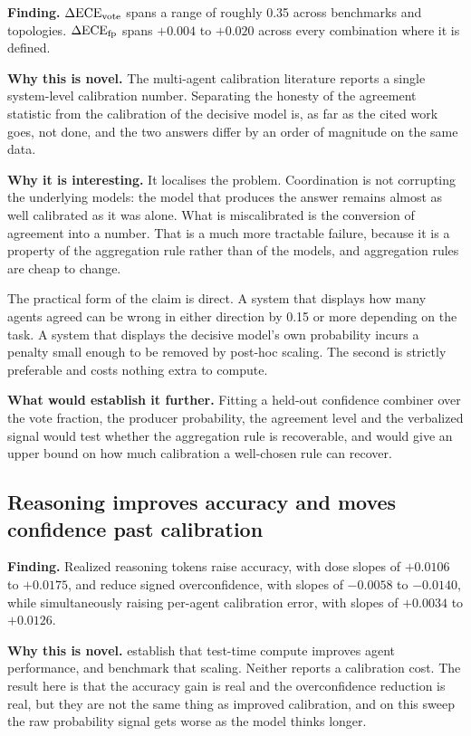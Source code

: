 \textbf{Finding.} $\Delta\mathrm{ECE}_{\mathrm{vote}}$ spans a range of roughly 0.35 across benchmarks and topologies.
$\Delta\mathrm{ECE}_{\mathrm{fp}}$ spans $+0.004$ to $+0.020$ across every combination where it is defined.

\textbf{Why this is novel.} The multi-agent calibration literature reports a single
system-level calibration number. Separating the honesty of the agreement statistic from the
calibration of the decisive model is, as far as the cited work goes, not done, and the
two answers differ by an order of magnitude on the same data.

\textbf{Why it is interesting.} It localises the problem. Coordination is not corrupting the
underlying models: the model that produces the answer remains almost as well calibrated as
it was alone. What is miscalibrated is the conversion of agreement into a number. That is a
much more tractable failure, because it is a property of the aggregation rule rather than of
the models, and aggregation rules are cheap to change.

The practical form of the claim is direct. A system that displays how many agents agreed
can be wrong in either direction by 0.15 or more depending on the task. A system that
displays the decisive model's own probability incurs a penalty small enough to be removed by
post-hoc scaling. The second is strictly preferable and costs nothing extra to compute.

\textbf{What would establish it further.} Fitting a held-out confidence combiner over the
vote fraction, the producer probability, the agreement level and the verbalized signal would
test whether the aggregation rule is recoverable, and would give an upper bound on how much
calibration a well-chosen rule can recover.

\subsection{Reasoning improves accuracy and moves confidence past calibration}

\textbf{Finding.} Realized reasoning tokens raise accuracy, with dose slopes of $+0.0106$ to
$+0.0175$, and reduce signed overconfidence, with slopes of $-0.0058$ to $-0.0140$, while
simultaneously raising per-agent calibration error, with slopes of $+0.0034$ to $+0.0126$.

\textbf{Why this is novel.} \citet{zhu2025testtime} establish that test-time compute
improves agent performance, and \citet{li2026agentbench} benchmark that scaling. Neither
reports a calibration cost. The result here is that the accuracy gain is real and the
overconfidence reduction is real, but they are not the same thing as improved calibration,
and on this sweep the raw probability signal gets worse as the model thinks longer.

